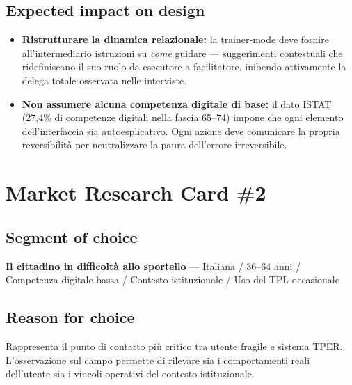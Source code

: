 \documentclass[11pt,a4paper]{article}
\begin{document}
\subsection*{Expected impact on design}
\begin{tcolorbox}[colback=backgroundColor,colframe=borderColor,arc=2mm]

\begin{itemize}[leftmargin=*,itemsep=6pt]

    \item \textbf{Ristrutturare la dinamica relazionale:}
    la trainer-mode deve fornire all'intermediario istruzioni su
    \textit{come} guidare --- suggerimenti contestuali che ridefiniscano
    il suo ruolo da esecutore a facilitatore, inibendo attivamente la
    delega totale osservata nelle interviste.

    \item \textbf{Non assumere alcuna competenza digitale di base:}
    il dato ISTAT (27,4\% di competenze digitali nella fascia 65--74)
    impone che ogni elemento dell'interfaccia sia autoesplicativo.
    Ogni azione deve comunicare la propria reversibilità per
    neutralizzare la paura dell'errore irreversibile.

\end{itemize}
\end{tcolorbox}

\newpage
\section*{Market Research Card \#2}

\subsection*{Segment of choice}
\begin{tcolorbox}[colback=backgroundColor,colframe=borderColor,arc=2mm]
\textbf{Il cittadino in difficoltà allo sportello} --- Italiana /
36--64 anni / Competenza digitale bassa / Contesto istituzionale /
Uso del TPL occasionale
\end{tcolorbox}

\subsection*{Reason for choice}
\begin{tcolorbox}[colback=backgroundColor,colframe=borderColor,arc=2mm]
Rappresenta il punto di contatto più critico tra utente fragile e
sistema TPER. L'osservazione sul campo permette di rilevare sia i
comportamenti reali dell'utente sia i vincoli operativi del contesto
istituzionale.
\end{tcolorbox}
\end{document}
